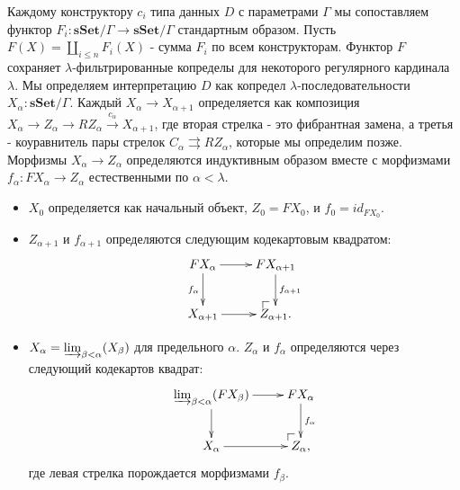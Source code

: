 \documentclass{amsart}
\makeatletter
\theoremstyle{definition}
\theoremstyle{remark}
\newcommand{\cat}[1]{\mathbf{#1}}
\newcommand{\sSet}{\cat{sSet}}
\numberwithin{figure}{section}
\newcommand{\po}[1][dr]{\save*!/#1+1.2pc/#1:(1,-1)@^{|-}\restore}
\makeatother
\begin{document}
Каждому конструктору $c_i$ типа данных $D$ с параметрами $\Gamma$ мы сопоставляем функтор $F_i : \sSet / \Gamma \to \sSet / \Gamma$ стандартным образом.
Пусть $F(X) = \coprod_{i \leq n} F_i(X)$ - сумма $F_i$ по всем конструкторам.
Функтор $F$ сохраняет $\lambda$-фильтрированные копределы для некоторого регулярного кардинала $\lambda$.
Мы определяем интерпретацию $D$ как копредел $\lambda$-последовательности $X_\alpha : \sSet / \Gamma$.
Каждый $X_\alpha \to X_{\alpha + 1}$ определяется как композиция $X_\alpha \to Z_\alpha \to R Z_\alpha \xrightarrow{c_\alpha} X_{\alpha + 1}$,
    где вторая стрелка - это фибрантная замена, а третья - коуравнитель пары стрелок $C_\alpha \rightrightarrows R Z_\alpha$, которые мы определим позже.
Морфизмы $X_\alpha \to Z_\alpha$ определяются индуктивным образом вместе с морфизмами $f_\alpha : F X_\alpha \to Z_\alpha$ естественными по $\alpha < \lambda$.
\begin{itemize}
\item $X_0$ определяется как начальный объект, $Z_0 = F X_0$, и $f_0 = id_{F X_0}$.
\item $Z_{\alpha + 1}$ и $f_{\alpha + 1}$ определяются следующим кодекартовым квадратом:
\[ \xymatrix{ F X_\alpha \ar[r] \ar[d]_{f_\alpha} & F X_{\alpha + 1} \ar[d]^{f_{\alpha + 1}} \\
              X_{\alpha + 1} \ar[r]               & \po Z_{\alpha + 1}.
            } \]
\item $X_\alpha = \varinjlim_{\beta < \alpha} (X_\beta)$ для предельного $\alpha$.
$Z_\alpha$ и $f_\alpha$ определяются через следующий кодекартов квадрат:
\[ \xymatrix{ \varinjlim_{\beta < \alpha} (F X_\beta) \ar[r] \ar[d] & F X_\alpha \ar[d]^{f_\alpha} \\
              X_\alpha \ar[r]                                       & \po Z_\alpha,
            } \]
где левая стрелка порождается морфизмами $f_\beta$.
\end{itemize}
\end{document}
